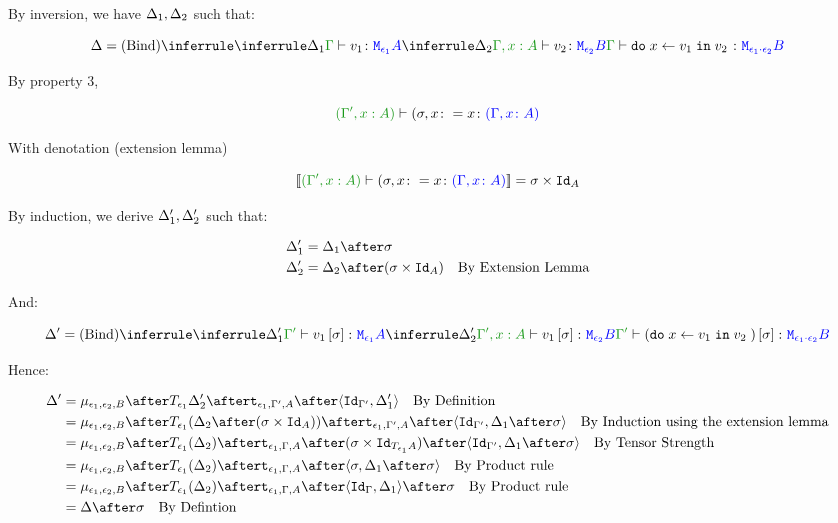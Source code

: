 \documentclass{report}
\begin{document}

By inversion, we have $\Delta_1, \Delta_2$ such that:

\begin{equation}
    \D = \ntreeruleII{Bind}{
        \treeruleI{\D_1}{\typerelation{\G}{v_1}{\M{\e_1}{A}}}
        }{
        \treeruleI{\D_2}{\typerelation{\G, x:A }{v_2}{\M{\e_2}{B}}}
    }{
        \typerelation{\G}{\doin{x}{v_1}{v_2}}{\M{\e_1\dot\e_2}{B}}
    }
\end{equation}

By property 3,

\begin{equation}
    \typerelation{(\G', x:A)}{(\si, x\setto x}{(\gax)}
\end{equation}

With denotation (extension lemma)

\begin{equation}
    \deno{\typerelation{(\G', x:A)}{(\si, x\setto x}{(\gax)}} = \si\times\Id{A}
\end{equation}

By induction, we derive $\Delta_1', \Delta_2'$ such that:

\begin{align}
    \D_1' & = \D_1\after \si\\
    \D_2' & = \D_2\after (\si\times\Id{A})\qt{By Extension Lemma}
\end{align}

And:

\begin{equation}
    \D' = \ntreeruleII{Bind}{
        \treeruleI{\D_1'}{\typerelation{\G'}{v_1\ssi}{\M{\e_1}{A}}}
        }{
        \treeruleI{\D_2'}{\typerelation{\G', x:A }{v_1\ssi}{\M{\e_2}{B}}}
    }{
        \typerelation{\G'}{(\doin{x}{v_1}{v_2})\ssi}{\M{\e_1\dot\e_2}{B}}
    }
\end{equation}

Hence:

\begin{align}
    \D' & = \bind{\e_1}{\e_2}{B}\after\T{\e_1}{\D_2'}\after\tstrength{\e_1}{\G'}{A}\after\pr{\Id{\G'}}{\D_1'}\qt{By Definition}\\
    & = \bind{\e_1}{\e_2}{B}\after\T{\e_1}{(\D_2\after(\si\times\Id{A}))}\after\tstrength{\e_1}{\G'}{A}\after\pr{\Id{\G'}}{\D_1\after\si}\qt{By Induction using the extension lemma}\\
    & = \bind{\e_1}{\e_2}{B}\after\T{\e_1}{(\D_2)}\after\tstrength{\e_1}{\G}{A}\after(\si\times\Id{\T{\e_1}{A}})\after\pr{\Id{\G'}}{\D_1\after\si}\qt{By Tensor Strength}\\
    & = \bind{\e_1}{\e_2}{B}\after\T{\e_1}{(\D_2)}\after\tstrength{\e_1}{\G}{A}\after\pr{\si}{\D_1\after\si}\qt{By Product rule}\\
    & = \bind{\e_1}{\e_2}{B}\after\T{\e_1}{(\D_2)}\after\tstrength{\e_1}{\G}{A}\after\pr{\idg}{\D_1}\after\si\qt{By Product rule}\\
    &= \D\after\si\qt{By Defintion}\\
\end{align}
\end{document}
